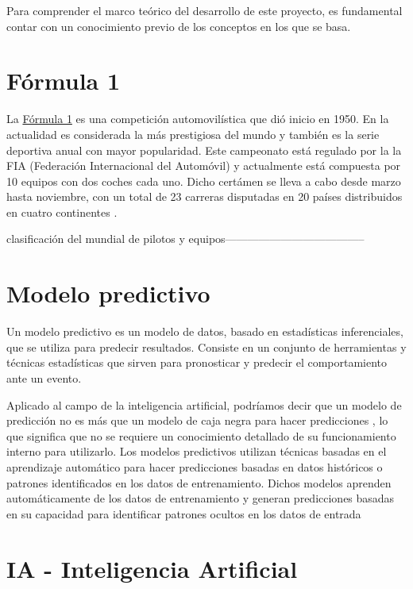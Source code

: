 
Para comprender el marco teórico del desarrollo de este proyecto, es fundamental contar con un conocimiento previo de los conceptos en los que se basa.


\section{Fórmula 1} 
La \href{https://www.formula1.com/}{Fórmula 1} es una competición automovilística que dió inicio en 1950. En la actualidad es considerada la más prestigiosa del mundo y también es la serie deportiva anual con mayor popularidad. Este campeonato está regulado por la la FIA (Federación Internacional del Automóvil) y actualmente está compuesta por 10 equipos con dos coches cada uno. Dicho certámen se lleva a cabo desde marzo hasta noviembre, con un total de 23 carreras disputadas en 20 países distribuidos en cuatro continentes \cite{f1:f1}.

clasificación del mundial de pilotos y equipos--------------------------------------

\section{Modelo predictivo}

Un modelo predictivo es un modelo de datos, basado en estadísticas inferenciales, que se utiliza para predecir resultados. Consiste en un conjunto de herramientas y técnicas estadísticas que sirven para pronosticar y predecir el comportamiento ante un evento. 

Aplicado al campo de la inteligencia artificial, podríamos decir que un modelo de predicción no es más que un modelo de caja negra para hacer predicciones \cite{art:predictmodel}, lo que significa que no se requiere un conocimiento detallado de su funcionamiento interno para utilizarlo. Los modelos predictivos utilizan técnicas basadas en el aprendizaje automático para hacer predicciones basadas en datos históricos o patrones identificados en los datos de entrenamiento. Dichos modelos aprenden automáticamente de los datos de entrenamiento y generan predicciones basadas en su capacidad para identificar patrones ocultos en los datos de entrada

\section{IA - Inteligencia Artificial}

